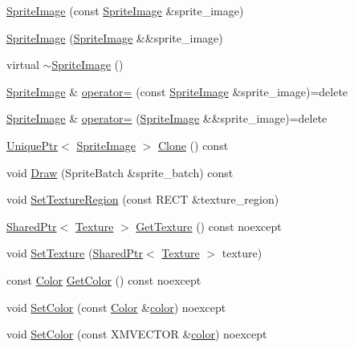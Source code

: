 \begin{DoxyCompactItemize}
\item 
\hyperlink{classmage_1_1_sprite_image_a7ce3b568dc3ff96e7467a8d00bba997d}{Sprite\+Image} (const \hyperlink{classmage_1_1_sprite_image}{Sprite\+Image} \&sprite\+\_\+image)
\item 
\hyperlink{classmage_1_1_sprite_image_ae1ea5c900498c8ecdf5dd3131d056dd5}{Sprite\+Image} (\hyperlink{classmage_1_1_sprite_image}{Sprite\+Image} \&\&sprite\+\_\+image)
\item 
virtual \hyperlink{classmage_1_1_sprite_image_a9121ee110f7e64ee6e936e0d3350ab44}{$\sim$\+Sprite\+Image} ()
\item 
\hyperlink{classmage_1_1_sprite_image}{Sprite\+Image} \& \hyperlink{classmage_1_1_sprite_image_a20d8e8272cf62599f6c0e4b1ff4f3586}{operator=} (const \hyperlink{classmage_1_1_sprite_image}{Sprite\+Image} \&sprite\+\_\+image)=delete
\item 
\hyperlink{classmage_1_1_sprite_image}{Sprite\+Image} \& \hyperlink{classmage_1_1_sprite_image_a9f83e728a93550f6b20bb4d500483171}{operator=} (\hyperlink{classmage_1_1_sprite_image}{Sprite\+Image} \&\&sprite\+\_\+image)=delete
\item 
\hyperlink{namespacemage_a8c307fbcc33bce9b7f2aa4c26c3b95cf}{Unique\+Ptr}$<$ \hyperlink{classmage_1_1_sprite_image}{Sprite\+Image} $>$ \hyperlink{classmage_1_1_sprite_image_a19db9a2a418dd04db0b38d1f8aa7e035}{Clone} () const
\item 
void \hyperlink{classmage_1_1_sprite_image_ae30d3293931f674fea17008063755bb6}{Draw} (Sprite\+Batch \&sprite\+\_\+batch) const
\item 
void \hyperlink{classmage_1_1_sprite_image_a99640fe6fc85d704f6a2831d0f663033}{Set\+Texture\+Region} (const R\+E\+CT \&texture\+\_\+region)
\item 
\hyperlink{namespacemage_a1e01ae66713838a7a67d30e44c67703e}{Shared\+Ptr}$<$ \hyperlink{classmage_1_1_texture}{Texture} $>$ \hyperlink{classmage_1_1_sprite_image_af0702a186685d80bab77c23643be1674}{Get\+Texture} () const noexcept
\item 
void \hyperlink{classmage_1_1_sprite_image_a12e0ffecc7995f13ccf0374fa37dc4c6}{Set\+Texture} (\hyperlink{namespacemage_a1e01ae66713838a7a67d30e44c67703e}{Shared\+Ptr}$<$ \hyperlink{classmage_1_1_texture}{Texture} $>$ texture)
\item 
const \hyperlink{structmage_1_1_color}{Color} \hyperlink{classmage_1_1_sprite_image_aa04711b85cbe98493edd8767ac3348b5}{Get\+Color} () const noexcept
\item 
void \hyperlink{classmage_1_1_sprite_image_ac061b1e201e24097d4b667b8fb53c232}{Set\+Color} (const \hyperlink{structmage_1_1_color}{Color} \&\hyperlink{namespacemage_a8ac46837ac2f6a9b756e66979165acd6}{color}) noexcept
\item 
void \hyperlink{classmage_1_1_sprite_image_a4ee2d13c618ef1c16e4cee8433f3d5dd}{Set\+Color} (const X\+M\+V\+E\+C\+T\+OR \&\hyperlink{namespacemage_a8ac46837ac2f6a9b756e66979165acd6}{color}) noexcept
\end{DoxyCompactItemize}
